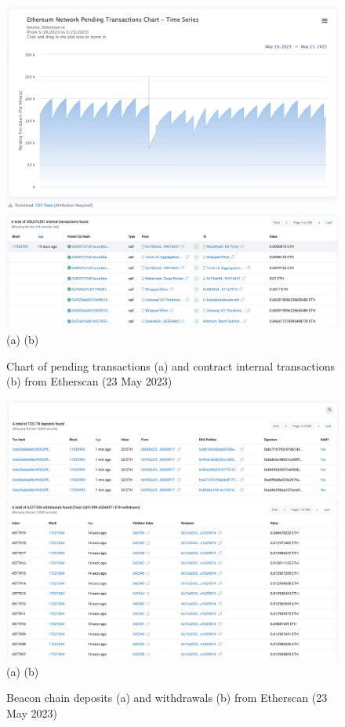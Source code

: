 \documentclass[UTF8]{article}
\begin{document}
\begin{figure}[htbp]
\begin{center}
\includegraphics[width=0.48\linewidth]{images/pendchart}
\includegraphics[width=0.48\linewidth]{images/internal} \\
(a)\hspace{160pt}        (b)\\
\caption{Chart of pending transactions (a) and contract internal transactions (b) from Etherscan (23 May 2023)}
\label{fig:pendchart}
\end{center}
\end{figure}

\begin{figure}[htbp]
\begin{center}
\includegraphics[width=0.48\linewidth]{images/deposits}
\includegraphics[width=0.48\linewidth]{images/withdrawals} \\
(a)\hspace{160pt}        (b)\\
\caption{Beacon chain deposits (a) and withdrawals (b) from Etherscan (23 May 2023)}
\label{fig:deposits}
\end{center}
\end{figure}
\end{document}
